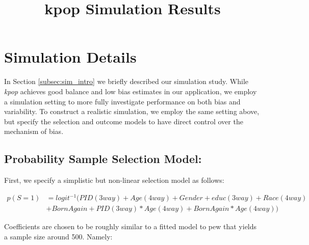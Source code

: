 \documentclass[
]{article}
\title{kpop Simulation Results}
\author{}
\date{\vspace{-2.5em}}
\begin{document}
\maketitle

\section{Simulation Details}
\label{app:simulations}

In Section \ref{subsec:sim_intro} we briefly described our simulation
study. While \textit{kpop} achieves good balance and low bias estimates
in our application, we employ a simulation setting to more fully
investigate performance on both bias and variability. To construct a
realistic simulation, we employ the same setting above, but specify the
selection and outcome models to have direct control over the mechanism
of bias.

\hypertarget{probability-sample-selection-model}{%
\subsection{Probability Sample Selection
Model:}\label{probability-sample-selection-model}}

First, we specify a simplistic but non-linear selection model as
follows:

\begin{align*}
p(S=1) &= logit^{-1}\Big( PID(3way) + Age(4way)+ Gender + educ(3way) + Race(4way) \\ 
&+ BornAgain + PID(3way)*Age(4way) + BornAgain*Age(4way)\Big)
\end{align*}

Coefficients are chosen to be roughly similar to a fitted model to pew
that yields a sample size around 500. Namely:
\end{document}

